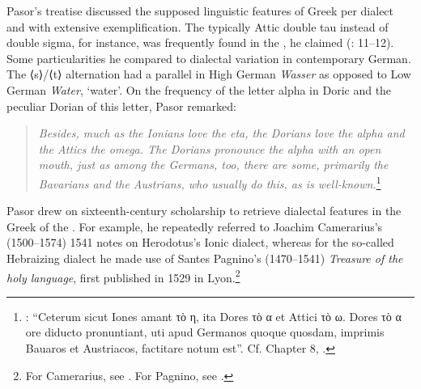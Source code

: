 Pasor’s treatise discussed the supposed linguistic features of  Greek per dialect and with extensive exemplification. The typically Attic double tau instead of double sigma, for instance, was frequently found in the , he claimed (\citealt{Pasor1632}: 11–12). Some particularities he compared to dialectal variation in contemporary German. The ⟨s⟩/⟨t⟩ alternation had a parallel in High German \textit{Wasser} as opposed to Low German \textit{Water}, ‘water’. On the frequency of the letter alpha in Doric and the peculiar Dorian  of this letter, Pasor remarked:

\begin{quote}
\emph{\textup{Besides,} \emph{much} \emph{as} \emph{the} \emph{Ionians} \emph{love} \emph{the} \emph{eta,} \emph{the} \emph{Dorians} \emph{love} \emph{the} \emph{alpha} \emph{and} \emph{the} \emph{Attics} \emph{the} \emph{omega.} \emph{The} \emph{Dorians} \emph{pronounce} \emph{the} \emph{alpha} \emph{with} \emph{an} \emph{open} \emph{mouth,} \emph{just} \emph{as} \emph{among} \emph{the} \emph{Germans,} \emph{too,} \emph{there} \emph{are} \emph{some,} \emph{primarily} \emph{the} \emph{Bavarians} \emph{and} \emph{the} \emph{Austrians,} \emph{who} \emph{usually} \emph{do} \emph{this,} \emph{as} \emph{is} \emph{well-known.}}\footnote{\citet[28]{Pasor1632}: “Ceterum sicut Iones amant τὸ η, ita Dores τὸ α et Attici τὸ ω. Dores τὸ α ore diducto pronuntiant, uti apud Germanos quoque quosdam, imprimis Bauaros et Austriacos, factitare notum est”. Cf. Chapter 8, .}
\end{quote}

Pasor drew on sixteenth-century scholarship to retrieve dialectal features in the Greek of the . For example, he repeatedly referred to Joachim Camerarius’s (1500–1574) 1541 notes on Herodotus’s Ionic dialect, whereas for the so-called Hebraizing dialect he made use of Santes Pagnino’s (1470–1541) \textit{Treasure of the holy language}, first published in 1529 in Lyon.\footnote{For Camerarius, see \citet[24--25, 27--28]{Pasor1632}. For Pagnino, see \citet[36]{Pasor1632}.}

